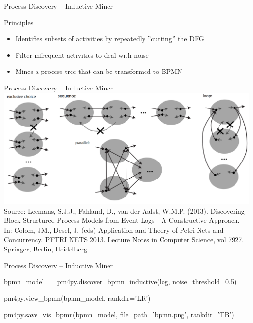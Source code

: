 \documentclass[ignorenonframetext,xcolor=x11names]{beamer}
\begin{document}
\begin{frame}{Process Discovery -- Inductive Miner}
\begin{block}{Principles}
\begin{itemize}
   \item Identifies subsets of activities by repeatedly ''cutting'' the DFG
   \item Filter infrequent activities to deal with noise
   \item Mines a process tree that can be transformed to BPMN
\end{itemize}
\end{block}
\end{frame}

\begin{frame}{Process Discovery -- Inductive Miner}
\includegraphics[width=\textwidth]{screen2.png}
\tiny 
Source: Leemans, S.J.J., Fahland, D., van der Aalst, W.M.P. (2013). Discovering Block-Structured Process Models from Event Logs - A Constructive Approach. In: Colom, JM., Desel, J. (eds) Application and Theory of Petri Nets and Concurrency. PETRI NETS 2013. Lecture Notes in Computer Science, vol 7927. Springer, Berlin, Heidelberg.
\end{frame}

\begin{frame}[fragile]{Process Discovery -- Inductive Miner}
\footnotesize
\begin{pythoncode}
bpmn_model = \
    pm4py.discover_bpmn_inductive(log, 
        noise_threshold=0.5)

pm4py.view_bpmn(bpmn_model, rankdir='LR')

pm4py.save_vis_bpmn(bpmn_model, 
   file_path='bpmn.png', rankdir='TB')
\end{pythoncode}
\end{frame}
\end{document}

